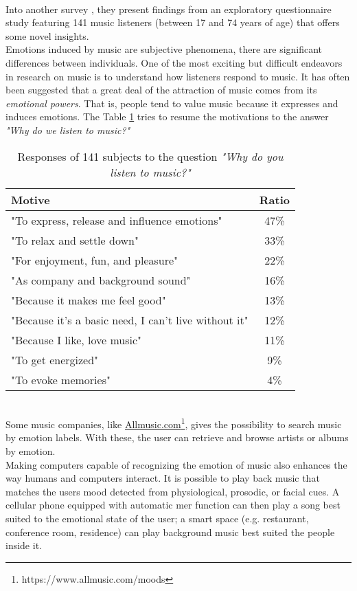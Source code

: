 \\
Into another survey \cite{juslin2004expression}, they present findings from an exploratory questionnaire study featuring 141 music listeners (between 17 and 74 years of age) that offers some novel insights. 
\\
Emotions induced by music are subjective phenomena, there are significant differences between individuals. One of the most exciting but difficult endeavors in research on music is to understand how listeners respond to music. It has often been suggested that a great deal of the attraction of music comes from its \textit{emotional powers}. That is, people tend to value music because it expresses and induces emotions.
\newpage
The Table \ref{table:motivation_music} tries to resume the motivations to the answer \textit{"Why do we listen to music?"}
\begin{table}[h!]
	\centering
	\begin{tabular}{|l | c|}
		\hline
		Motive & Ratio\\ [0.5ex] 
		\hline\hline "To express, release and influence emotions"	&	47\%	\\ 
		\hline "To relax and settle down"										&	33\%	\\
		\hline "For enjoyment, fun, and pleasure"							&	22\%	\\
		\hline "As company and background sound"						&	16\%	\\
		\hline "Because it makes me feel good"								&	13\%	\\
		\hline "Because it's a basic need, I can't live without it"		&	12\%	\\
		\hline "Because I like, love music"										&	11\%	\\
		\hline "To get energized"													&	9\%	\\
		\hline "To evoke memories"												&	4\%	\\ 
		\hline
	\end{tabular}
	\caption{Responses of 141 subjects to the question \textit{"Why do you listen to music?"}}
	\label{table:motivation_music}
\end{table}
\\ \indent
Some music companies, like  \href{https://www.allmusic.com/moods}{Allmusic.com}\footnote{https://www.allmusic.com/moods}, gives the possibility to search music by emotion labels. With these, the user can retrieve and browse artists or albums by emotion.
\\ \indent
Making computers capable of recognizing the emotion of music also enhances the way humans and computers interact. It is possible to play back music that matches the users mood detected from physiological, prosodic, or facial cues. A cellular phone equipped with automatic \gls{mer} function can then play a song best suited to the emotional state of the user; a smart space (e.g. restaurant, conference room, residence) can play background music best suited the people inside it.

